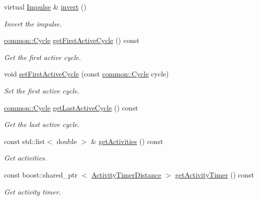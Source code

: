 \begin{DoxyCompactItemize}
virtual \hyperlink{classcryomesh_1_1components_1_1Impulse}{\-Impulse} \& \hyperlink{classcryomesh_1_1components_1_1Impulse_a21d17ce78d670cfc7082d5d09767c359}{invert} ()
\begin{DoxyCompactList}\small\item\em \-Invert the impulse. \end{DoxyCompactList}\item 
\hyperlink{classcryomesh_1_1common_1_1Cycle}{common\-::\-Cycle} \hyperlink{classcryomesh_1_1components_1_1Impulse_a348598ef30bd651b94ebbc0cdc46cb28}{get\-First\-Active\-Cycle} () const 
\begin{DoxyCompactList}\small\item\em \-Get the first active cycle. \end{DoxyCompactList}\item 
void \hyperlink{classcryomesh_1_1components_1_1Impulse_abe6cffbd621e68849bff60ce6799ff4b}{set\-First\-Active\-Cycle} (const \hyperlink{classcryomesh_1_1common_1_1Cycle}{common\-::\-Cycle} cycle)
\begin{DoxyCompactList}\small\item\em \-Set the first active cycle. \end{DoxyCompactList}\item 
\hyperlink{classcryomesh_1_1common_1_1Cycle}{common\-::\-Cycle} \hyperlink{classcryomesh_1_1components_1_1Impulse_ac91dae86e992103f921da77f0cfe0d02}{get\-Last\-Active\-Cycle} () const 
\begin{DoxyCompactList}\small\item\em \-Get the last active cycle. \end{DoxyCompactList}\item 
const std\-::list$<$ double $>$ \& \hyperlink{classcryomesh_1_1components_1_1Impulse_a959076c6c59932abeaa73ca6de2e4167}{get\-Activities} () const 
\begin{DoxyCompactList}\small\item\em \-Get activities. \end{DoxyCompactList}\item 
const boost\-::shared\-\_\-ptr\*
$<$ \hyperlink{classcryomesh_1_1components_1_1ActivityTimerDistance}{\-Activity\-Timer\-Distance} $>$ \hyperlink{classcryomesh_1_1components_1_1Impulse_a356adeb4cebeb35ecef7231718fb20cd}{get\-Activity\-Timer} () const 
\begin{DoxyCompactList}\small\item\em \-Get activity timer. \end{DoxyCompactList}\item 

\end{DoxyCompactItemize}
